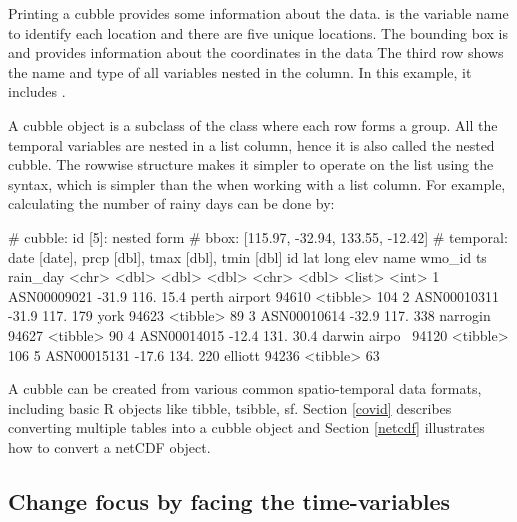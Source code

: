 \documentclass[
]{jss}
\begin{document}
Printing a cubble provides some information about the data.  is the variable name to identify each location and there are five unique locations. The bounding box is \code{[115.97, -32.94, 133.55, -12.42]} and provides information about the coordinates in the data The third row shows the name and type of all variables nested in the  column. In this example, it includes .

A cubble object is a subclass of the  class where each row forms a group. All the temporal variables are nested in a list column, hence it is also called the nested cubble. The rowwise structure makes it simpler to operate on the list using the  syntax, which is simpler than the  when working with a list column. For example, calculating the number of rainy days can be done by:

\begin{CodeChunk}
\begin{CodeOutput}
# cubble:   id [5]: nested form
# bbox:     [115.97, -32.94, 133.55, -12.42]
# temporal: date [date], prcp [dbl], tmax [dbl], tmin [dbl]
  id            lat  long  elev name          wmo_id ts       rain_day
  <chr>       <dbl> <dbl> <dbl> <chr>          <dbl> <list>      <int>
1 ASN00009021 -31.9  116.  15.4 perth airport  94610 <tibble>      104
2 ASN00010311 -31.9  117. 179   york           94623 <tibble>       89
3 ASN00010614 -32.9  117. 338   narrogin       94627 <tibble>       90
4 ASN00014015 -12.4  131.  30.4 darwin airpo~  94120 <tibble>      106
5 ASN00015131 -17.6  134. 220   elliott        94236 <tibble>       63
\end{CodeOutput}
\end{CodeChunk}

A cubble can be created from various common spatio-temporal data formats, including basic R objects like tibble, tsibble, sf. Section \ref{covid} describes converting multiple tables into a cubble object and Section \ref{netcdf} illustrates how to convert a netCDF object.

\hypertarget{change-focus-by-facing-the-time-variables}{%
\subsection{Change focus by facing the time-variables}\label{change-focus-by-facing-the-time-variables}}
\end{document}
